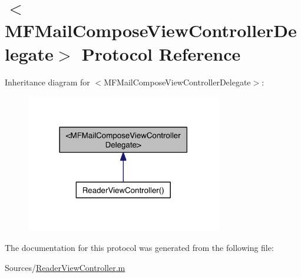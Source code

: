 \hypertarget{class_m_f_mail_compose_view_controller_delegate-p}{\section{$<$M\-F\-Mail\-Compose\-View\-Controller\-Delegate$>$ Protocol Reference}
\label{d5/dab/class_m_f_mail_compose_view_controller_delegate-p}
}


Inheritance diagram for $<$M\-F\-Mail\-Compose\-View\-Controller\-Delegate$>$\-:
\nopagebreak
\begin{figure}[H]
\begin{center}
\leavevmode
\includegraphics[width=242pt]{dc/d6a/class_m_f_mail_compose_view_controller_delegate-p__inherit__graph}
\end{center}
\end{figure}


The documentation for this protocol was generated from the following file\-:\begin{DoxyCompactItemize}
\item 
Sources/\hyperlink{_reader_view_controller_8m}{Reader\-View\-Controller.\-m}\end{DoxyCompactItemize}

